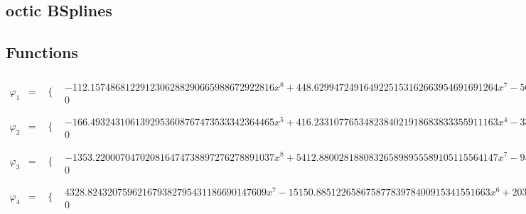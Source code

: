 \documentclass{article}
\begin{document}
 

\begin{landscape}
\section{octic BSplines}
\subsection{Functions}\begin{eqnarray*} \varphi_1 & = & \begin{array}{cc}
 \{ & 
\begin{array}{cc}
 -112.1574868122912306288290665988672922816 x^8+448.6299472491649225153162663954691691264 x^7-560.7874340614561531441453329943364614080 x^6+112.1574868122912306288290665988672922816 x^5+280.3937170307280765720726664971682307040 x^4-224.3149736245824612576581331977345845632 x^3+56.07874340614561531441453329943364614080 x^2 & x\geq 0\land x<1 \\
 0 & \text{True}
\end{array}

\end{array}\\
\varphi_2 & = & \begin{array}{cc}
 \{ & 
\begin{array}{cc}
 -166.4932431061392953608767473533342364465 x^5+416.2331077653482384021918683833355911163 x^4-332.9864862122785907217534947066684728930 x^3+83.24662155306964768043837367666711822325 x^2 & x\geq 0\land x<1 \\
 0 & \text{True}
\end{array}

\end{array}\\
\varphi_3 & = & \begin{array}{cc}
 \{ & 
\begin{array}{cc}
 -1353.220007047020816474738897276278891037 x^8+5412.880028188083265898955589105115564147 x^7-9535.083831167453400118223238371091177599 x^6+9660.171394844068769708325153245369058283 x^5-5846.895968823612351294915263441625180460 x^4+1908.532979126540563291403458763603421952 x^3-246.3845951206060310108068020250927952868 x^2 & x\geq 0\land x<1 \\
 0 & \text{True}
\end{array}

\end{array}\\
\varphi_4 & = & \begin{array}{cc}
 \{ & 
\begin{array}{cc}
 4328.824320759621679382795431186690147609 x^7-15150.88512265867587783978400915341551663 x^6+20312.17565894899403402696317710677684647 x^5-12903.22634072579539046794791988340332460 x^4+3829.344591441203793300165189126687438270 x^3-416.2331077653482384021918683833355911163 x^2 & x\geq 0\land x<1 \\
 0 & \text{True}
\end{array}


\end{array}
\end{eqnarray*}
\end{landscape}
\end{document}
